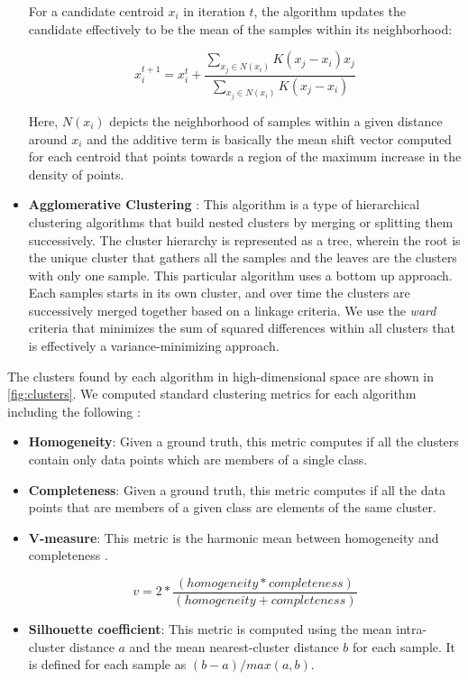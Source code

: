 \begin{itemize}
For a candidate centroid $x_i$ in iteration $t$, the algorithm updates
the candidate effectively to be the mean of the samples within its neighborhood:

$$x_{i}^{t+1} = x_{i}^{t} + \frac{\sum_{x_{j} \in N(x_i)}K(x_{j} -
x_{i})x_{j}}{\sum_{x_{j} \in N(x_{i})}K(x_{j} - x_{i})} $$

Here, $N(x_i)$ depicts the neighborhood of samples within a given distance
around $x_i$ and the additive term is basically the mean shift vector 
computed for each centroid that points towards a region of the maximum
increase in the density of points.

\item \textbf{Agglomerative Clustering} :
This algorithm is a type of hierarchical clustering algorithms that build nested clusters 
by merging or splitting them successively. 
The cluster hierarchy is represented as a tree, wherein the root is the unique
cluster that gathers all the samples and the leaves are the clusters with only
one sample. 
This particular algorithm uses a bottom up approach. Each samples starts in
its own cluster, and over time the clusters are successively merged together
based on a linkage criteria.
We use the \textit{ward} criteria that minimizes the sum of squared differences 
within all clusters that is effectively a variance-minimizing approach.

\end{itemize}

The clusters found by each algorithm in high-dimensional space are shown in
\cref{fig:clusters}.
We computed standard clustering metrics for each algorithm including the
following :

\begin{itemize}
  \item \textbf{Homogeneity}:
	Given a ground truth, this metric computes if all the clusters contain only
	data points which are members of a single class.
  \item \textbf{Completeness}: 
	Given a ground truth, this metric computes if all the data points that are
	members of a given class are elements of the same cluster.
  \item \textbf{V-measure}: 
	This metric is the harmonic mean between homogeneity and completeness
	\citep{v-measure}.

	$$v = 2 * \frac{(homogeneity * completeness)}{(homogeneity + completeness)}$$

  \item \textbf{Silhouette coefficient}: 
  This metric is computed using the mean intra-cluster distance
  $a$ and the mean nearest-cluster distance $b$ for each sample.
  It is defined for each sample as $(b-a)/max(a, b)$.
\end{itemize}

